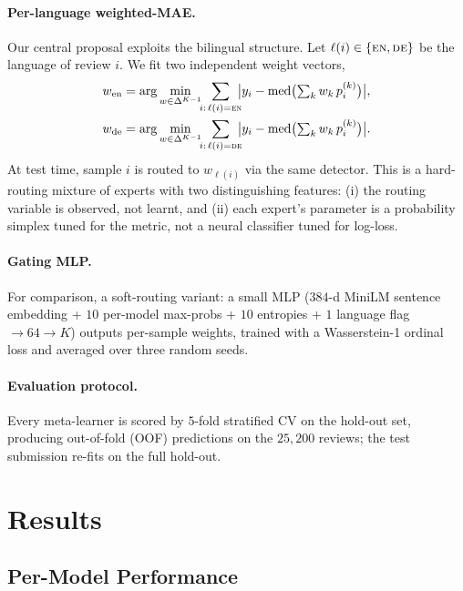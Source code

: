 \documentclass{article}
\theoremstyle{plain}
\begin{document}
\paragraph{Per-language weighted-MAE.}
Our central proposal exploits the bilingual structure. Let
$\ell(i)\in\{\textsc{en},\textsc{de}\}$ be the language of review $i$.
We fit two independent weight vectors,
\begin{align*}
w_{\mathrm{en}}&=\arg\min_{w\in\Delta^{K-1}}\!\!\sum_{i:\,\ell(i)=\textsc{en}}\!\!
   \bigl|y_i-\mathrm{med}\bigl(\textstyle\sum_k w_k\, p^{(k)}_i\bigr)\bigr|, \\
w_{\mathrm{de}}&=\arg\min_{w\in\Delta^{K-1}}\!\!\sum_{i:\,\ell(i)=\textsc{de}}\!\!
   \bigl|y_i-\mathrm{med}\bigl(\textstyle\sum_k w_k\, p^{(k)}_i\bigr)\bigr|.
\end{align*}
At test time, sample $i$ is routed to $w_{\ell(i)}$ via the same
detector. This is a hard-routing mixture of experts
\cite{jacobs1991moe} with two distinguishing features: (i) the routing
variable is observed, not learnt, and (ii) each expert's parameter is
a probability simplex tuned for the metric, not a neural classifier
tuned for log-loss.

\paragraph{Gating MLP.}
For comparison, a soft-routing variant: a small MLP ($384$-d MiniLM
sentence embedding + $10$ per-model max-probs + $10$ entropies + $1$
language flag $\to 64\to K$) outputs per-sample weights, trained with
a Wasserstein-1 ordinal loss and averaged over three random seeds.

\paragraph{Evaluation protocol.}
Every meta-learner is scored by $5$-fold stratified CV on the hold-out
set, producing out-of-fold (OOF) predictions on the $25{,}200$
reviews; the test submission re-fits on the full hold-out.

\section{Results}
\label{sec:results}

\subsection{Per-Model Performance}
\label{sec:per-model}
\end{document}

